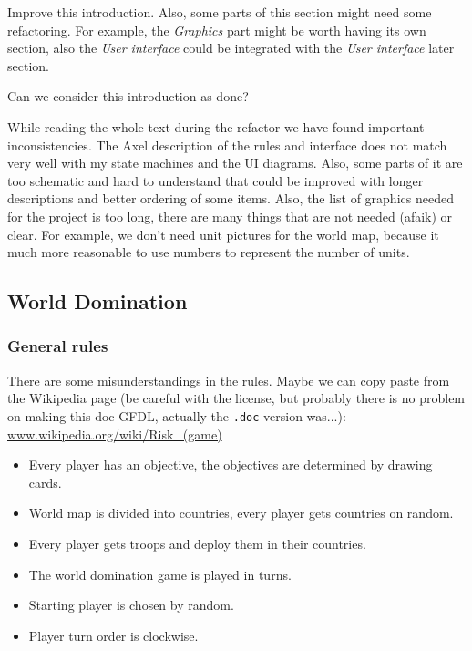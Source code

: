 \documentclass[12pt,a4paper]{article}
\begin{document}
\begin{todo}
  Improve this introduction. Also, some parts of this section might need
  some refactoring. For example, the \emph{Graphics} part might be worth
  having its own section, also the \emph{User interface} could be
  integrated with the \emph{User interface} later section.
\end{todo}

\begin{todo}[Alberto]
  Can we consider this introduction as done?
\end{todo}

\begin{todo}
  While reading the whole text during the refactor we have found
  important inconsistencies. The Axel description of the rules and
  interface does not match very well with my state machines and the UI
  diagrams. Also, some parts of it are too schematic and hard to
  understand that could be improved with longer descriptions and
  better ordering of some items. Also, the list of graphics needed for
  the project is too long, there are many things that are not needed
  (afaik) or clear. For example, we don't need unit pictures for the
  world map, because it much more reasonable to use numbers to
  represent the number of units.
\end{todo}

\subsection{World Domination}

\subsubsection{General rules}

\begin{todo}
  There are some misunderstandings in the rules. Maybe we can copy paste
  from the Wikipedia page (be careful with the license, but probably
  there is no problem on making this doc GFDL, actually the
  \texttt{.doc} version was...):
  \url{www.wikipedia.org/wiki/Risk_(game)}
\end{todo}

\begin{itemize}
\item Every player has an objective, the objectives are determined by
  drawing cards.
\item World map is divided into countries, every player gets countries
  on random.
\item Every player gets troops and deploy them in their countries.
\item The world domination game is played in turns.
\item Starting player is chosen by random.
\item Player turn order is clockwise.
\end{itemize}
\end{document}
